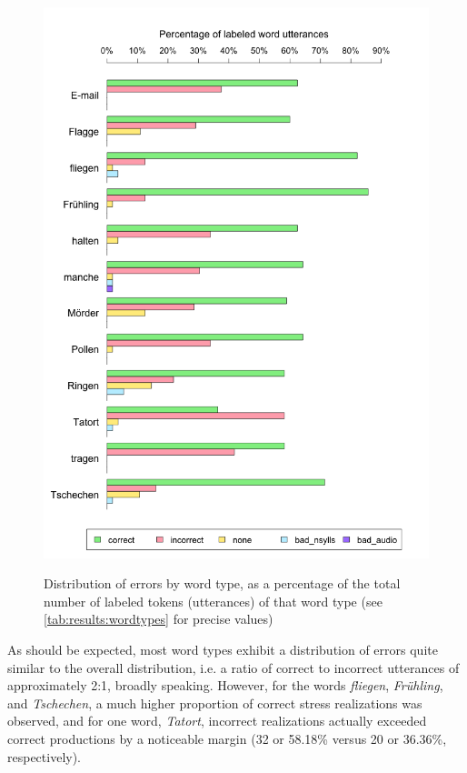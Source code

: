 			\begin{figure}[htbp]
				\centering
				\caption[Error distribution by word type]{Distribution of errors by word type,
				as a percentage of the total number of labeled tokens (utterances) of that word type 
				(see \cref{tab:results:wordtypes} for precise values)
				}
				\includegraphics[width=\textwidth]{img/plots/judgmentsWordTypes}
				\label{fig:results:wordbars}
			\end{figure}	
			
			As should be expected, most word types exhibit a distribution of errors quite similar to the overall distribution, i.e. a ratio of correct to incorrect utterances of approximately 2:1, broadly speaking. However, for the words \textit{fliegen}, \textit{Fr\"{u}hling}, and \textit{Tschechen}, a much higher proportion of correct stress realizations was observed,
			and for one word, \textit{Tatort}, incorrect realizations actually exceeded correct productions by a noticeable margin (32 or 58.18\% versus 20 or 36.36\%, respectively). 
			

